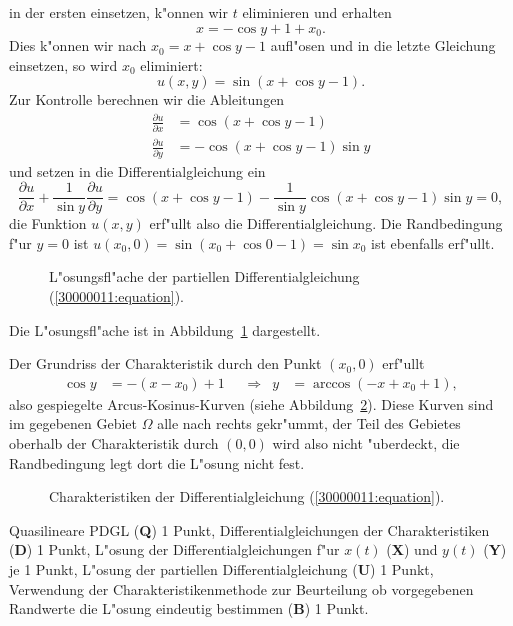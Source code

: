 \begin{loesung}
\begin{teilaufgaben}
in der ersten einsetzen, k"onnen wir $t$ eliminieren und erhalten
\[
x=-\cos y+1+x_0.
\]
Dies k"onnen wir nach $x_0=x+\cos y-1$ aufl"osen und in die letzte Gleichung
einsetzen, so wird $x_0$ eliminiert:
\[
u(x,y)=\sin(x+\cos y - 1).
\]
Zur Kontrolle berechnen wir die Ableitungen
\begin{align*}
\frac{\partial u}{\partial x}
&=
\cos(x+\cos y - 1)
\\
\frac{\partial u}{\partial y}
&=
-\cos(x+\cos y - 1)
\sin y
\end{align*}
und setzen in die Differentialgleichung ein
\[
\frac{\partial u}{\partial x}
+
\frac1{\sin y}\frac{\partial u}{\partial y}
=
\cos(x+\cos y - 1)
-
\frac1{\sin y}
\cos(x+\cos y - 1)
\sin y
=
0,
\]
die Funktion $u(x,y)$ erf"ullt also die Differentialgleichung. 
Die Randbedingung f"ur $y=0$ ist $u(x_0,0)=\sin(x_0+\cos 0 - 1)=\sin x_0$
ist ebenfalls erf"ullt.
\begin{figure}
\centering
{}
\caption{L"osungsfl"ache der partiellen Differentialgleichung
(\ref{30000011:equation}).
\label{30000011:solution}}
\end{figure}
Die L"osungsfl"ache ist in Abbildung~\ref{30000011:solution} dargestellt.
\item
Der Grundriss der Charakteristik durch den Punkt $(x_0,0)$ erf"ullt
\[
\begin{aligned}
\cos y&=-(x-x_0)+1
&&\Rightarrow&
y&=\arccos(-x+x_0+1),
\end{aligned}
\]
also gespiegelte Arcus-Kosinus-Kurven (siehe Abbildung~\ref{30000011:char}).
Diese Kurven sind im gegebenen Gebiet $\Omega$ alle nach rechts gekr"ummt,
der Teil des Gebietes oberhalb der Charakteristik durch $(0,0)$ wird also
nicht "uberdeckt, die Randbedingung legt dort die L"osung nicht fest.
\qedhere
\begin{figure}
\centering
{}
\caption{Charakteristiken der Differentialgleichung (\ref{30000011:equation}).
\label{30000011:char}}
\end{figure}
\end{teilaufgaben}
\end{loesung}

\begin{bewertung}
Quasilineare PDGL ({\bf Q}) 1 Punkt,
Differentialgleichungen der Charakteristiken ({\bf D}) 1 Punkt,
L"osung der Differentialgleichungen f"ur $x(t)$ ({\bf X})
und $y(t)$ ({\bf Y}) je 1 Punkt,
L"osung der partiellen Differentialgleichung ({\bf U}) 1 Punkt,
Verwendung der Charakteristikenmethode zur Beurteilung ob
vorgegebenen Randwerte die L"osung eindeutig bestimmen ({\bf B}) 1 Punkt.
\end{bewertung}

